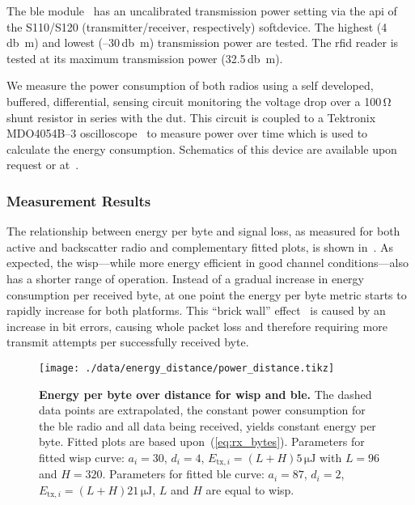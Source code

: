 \documentclass[conference,letterpaper,twoside,final,10pt]{IEEEtran}
\begin{document}
The \ac{ble} module~\cite{nordic2012nrf51822} has an uncalibrated transmission power setting via the \acs{api} of the S110/S120 (transmitter/receiver, respectively) softdevice.
The highest (4\,\si{\decibel m}) and lowest (--30\,\si{\decibel m}) transmission power are tested.
The \ac{rfid} reader is tested at its maximum transmission power (32.5\,\si{\decibel m}).

We measure the power consumption of both radios using a self developed, buffered, differential, sensing circuit monitoring the voltage drop over a 100\,\si{\ohm} shunt resistor in series with the \ac{dut}.
This circuit is coupled to a Tektronix MDO4054B\mbox{--}3 oscilloscope~\cite{tektronix2015mdo4000} to measure power over time which is used to calculate the energy consumption.
Schematics of this device are available upon request or at~\cite{blisp2015repo}.

\subsubsection{Measurement Results}
\label{sec:motivation/results}

The relationship between energy per byte and signal loss, as measured for both active and backscatter radio and complementary fitted plots, is shown in~.
As expected, the \ac{wisp}---while more energy efficient in good channel conditions---also has a shorter range of operation.
Instead of a gradual increase in energy consumption per received byte, at one point the energy per byte metric starts to rapidly increase for both platforms.
This ``brick wall'' effect~\cite[Sec. V]{lettieri1998info} is caused by an increase in bit errors, causing whole packet loss and therefore requiring more transmit attempts per successfully received byte.

\begin{figure}
	\centering
	\texttt{[image: ./data/energy\_distance/power\_distance.tikz]}
	\vspace{-25pt}
	\caption{\textbf{Energy per byte over distance for \acs{wisp} and \acs{ble}.}
	The dashed data points are extrapolated, the constant power consumption for the \acs{ble} radio and all data being received, yields constant energy per byte.
	Fitted plots are based upon~(\ref{eq:rx_bytes}).
	Parameters for fitted \acs{wisp} curve: $a_{i} = 30$, $d_{i} = 4$, $E_{\text{tx},i} = (L + H) 5\,\si{\micro\joule}$ with $L = 96$ and $H = 320$.
	Parameters for fitted \acs{ble} curve: $a_{i} = 87$, $d_{i} = 2$, $E_{\text{tx},i} = (L + H) 21\,\si{\micro\joule}$, $L$ and $H$ are equal to \acs{wisp}.
	}
	\label{fig:power_distance}
\end{figure}
\end{document}
